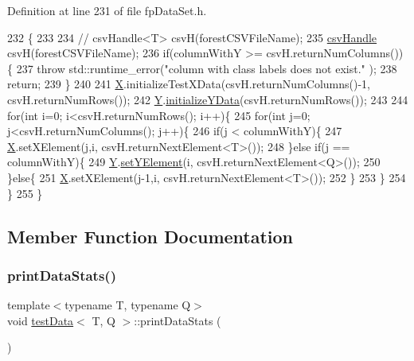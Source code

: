Definition at line 231 of file fp\+Data\+Set.\+h.


\begin{DoxyCode}
232         \{
233 
234             \textcolor{comment}{//          csvHandle<T> csvH(forestCSVFileName);}
235             \hyperlink{classcsvHandle}{csvHandle} csvH(forestCSVFileName);
236             \textcolor{keywordflow}{if}(columnWithY >= csvH.returnNumColumns())\{
237                 \textcolor{keywordflow}{throw} std::runtime\_error(\textcolor{stringliteral}{"column with class labels does not exist."} );
238                 \textcolor{keywordflow}{return};
239             \}
240 
241             \hyperlink{classtestData_aaed20c168b252c39fb9dc56757315eee}{X}.initializeTestXData(csvH.returnNumColumns()-1, csvH.returnNumRows());
242             \hyperlink{classtestData_a97961fe071062be1146fcbcb1aaf7a00}{Y}.\hyperlink{classinputYData_abe1f8827e0bc89cec0c218ed5cfeea72}{initializeYData}(csvH.returnNumRows());
243 
244             \textcolor{keywordflow}{for}(\textcolor{keywordtype}{int} i=0; i<csvH.returnNumRows(); i++)\{
245                 \textcolor{keywordflow}{for}(\textcolor{keywordtype}{int} j=0; j<csvH.returnNumColumns(); j++)\{
246                     \textcolor{keywordflow}{if}(j < columnWithY)\{
247                         \hyperlink{classtestData_aaed20c168b252c39fb9dc56757315eee}{X}.setXElement(j,i, csvH.returnNextElement<T>());
248                     \}\textcolor{keywordflow}{else} \textcolor{keywordflow}{if}(j == columnWithY)\{
249                         \hyperlink{classtestData_a97961fe071062be1146fcbcb1aaf7a00}{Y}.\hyperlink{classinputYDataClassification_ae6f3f163739a75bb379dd80d7c9649a2}{setYElement}(i, csvH.returnNextElement<Q>());
250                     \}\textcolor{keywordflow}{else}\{
251                         \hyperlink{classtestData_aaed20c168b252c39fb9dc56757315eee}{X}.setXElement(j-1,i, csvH.returnNextElement<T>());
252                     \}
253                 \}
254             \}
255         \}
\end{DoxyCode}


\subsection{Member Function Documentation}
\mbox{\label{classtestData_a4c7ffb7eba48e534923d2701437af5e3}} 
\subsubsection{\texorpdfstring{print\+Data\+Stats()}{printDataStats()}}
{\footnotesize\ttfamily template$<$typename T, typename Q$>$ \\
void \hyperlink{classtestData}{test\+Data}$<$ T, Q $>$\+::print\+Data\+Stats (\begin{DoxyParamCaption}{ }\end{DoxyParamCaption})\hspace{0.3cm}{\ttfamily [inline]}}



